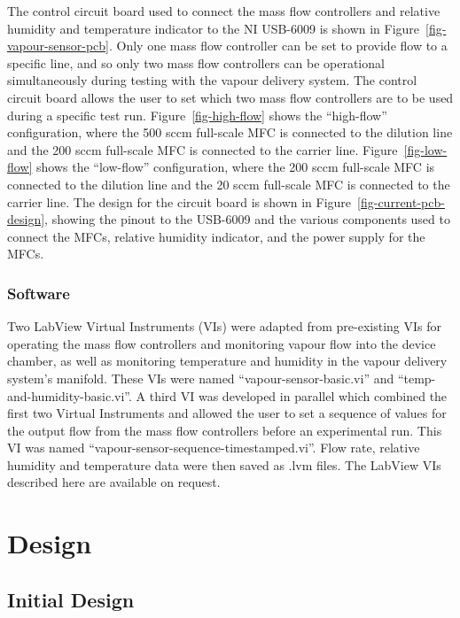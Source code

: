 \documentclass[
  a4paper,
]{scrbook}
\begin{document}
The control circuit board used to connect the mass flow controllers and
relative humidity and temperature indicator to the NI USB-6009 is shown
in Figure~\ref{fig-vapour-sensor-pcb}. Only one mass flow controller can
be set to provide flow to a specific line, and so only two mass flow
controllers can be operational simultaneously during testing with the
vapour delivery system. The control circuit board allows the user to set
which two mass flow controllers are to be used during a specific test
run. Figure~\ref{fig-high-flow} shows the ``high-flow'' configuration,
where the 500 sccm full-scale MFC is connected to the dilution line and
the 200 sccm full-scale MFC is connected to the carrier line.
Figure~\ref{fig-low-flow} shows the ``low-flow'' configuration, where
the 200 sccm full-scale MFC is connected to the dilution line and the 20
sccm full-scale MFC is connected to the carrier line. The design for the
circuit board is shown in Figure~\ref{fig-current-pcb-design}, showing
the pinout to the USB-6009 and the various components used to connect
the MFCs, relative humidity indicator, and the power supply for the
MFCs.

\hypertarget{software}{%
\subsubsection*{Software}\label{software}}

Two LabView Virtual Instruments (VIs) were adapted from pre-existing VIs
for operating the mass flow controllers and monitoring vapour flow into
the device chamber, as well as monitoring temperature and humidity in
the vapour delivery system's manifold. These VIs were named
``vapour-sensor-basic.vi'' and ``temp-and-humidity-basic.vi''. A third
VI was developed in parallel which combined the first two Virtual
Instruments and allowed the user to set a sequence of values for the
output flow from the mass flow controllers before an experimental run.
This VI was named ``vapour-sensor-sequence-timestamped.vi''. Flow rate,
relative humidity and temperature data were then saved as .lvm files.
The LabView VIs described here are available on request.

\hypertarget{sec-vapour-system-design}{%
\section{Design}\label{sec-vapour-system-design}}

\hypertarget{initial-design}{%
\subsection{Initial Design}\label{initial-design}}
\end{document}
